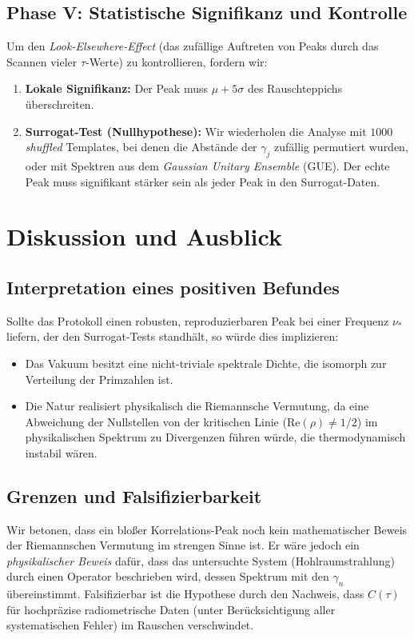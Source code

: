 \documentclass[11pt, a4paper]{article}
\begin{document}
	\subsection{Phase V: Statistische Signifikanz und Kontrolle}
	Um den \textit{Look-Elsewhere-Effect} (das zufällige Auftreten von Peaks durch das Scannen vieler $\tau$-Werte) zu kontrollieren, fordern wir:
	\begin{enumerate}
		\item \textbf{Lokale Signifikanz:} Der Peak muss $\mu + 5\sigma$ des Rauschteppichs überschreiten.
		\item \textbf{Surrogat-Test (Nullhypothese):} Wir wiederholen die Analyse mit $1000$ \textit{shuffled} Templates, bei denen die Abstände der $\gamma_j$ zufällig permutiert wurden, oder mit Spektren aus dem \textit{Gaussian Unitary Ensemble} (GUE). Der echte Peak muss signifikant stärker sein als jeder Peak in den Surrogat-Daten.
	\end{enumerate}
	
	\section{Diskussion und Ausblick}
	
	\subsection{Interpretation eines positiven Befundes}
	Sollte das Protokoll einen robusten, reproduzierbaren Peak bei einer Frequenz $\nu_*$ liefern, der den Surrogat-Tests standhält, so würde dies implizieren:
	\begin{itemize}
		\item Das Vakuum besitzt eine nicht-triviale spektrale Dichte, die isomorph zur Verteilung der Primzahlen ist.
		\item Die Natur realisiert physikalisch die Riemannsche Vermutung, da eine Abweichung der Nullstellen von der kritischen Linie ($\text{Re}(\rho) \neq 1/2$) im physikalischen Spektrum zu Divergenzen führen würde, die thermodynamisch instabil wären.
	\end{itemize}
	
	\subsection{Grenzen und Falsifizierbarkeit}
	Wir betonen, dass ein bloßer Korrelations-Peak noch kein mathematischer Beweis der Riemannschen Vermutung im strengen Sinne ist. Er wäre jedoch ein \textit{physikalischer Beweis} dafür, dass das untersuchte System (Hohlraumstrahlung) durch einen Operator beschrieben wird, dessen Spektrum mit den $\gamma_n$ übereinstimmt.
	Falsifizierbar ist die Hypothese durch den Nachweis, dass $C(\tau)$ für hochpräzise radiometrische Daten (unter Berücksichtigung aller systematischen Fehler) im Rauschen verschwindet.
	
\end{document}
